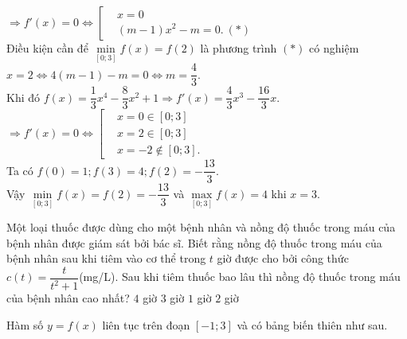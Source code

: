 \begin{ex}
\begin{ex}
{ $\Rightarrow f'(x)=0 \Leftrightarrow\left[\begin{aligned}&x=0 \\& (m-1) x^2-m=0.~(*)\end{aligned}\right. $ \\
 Điều kiện cần để $\min\limits_{[0; 3]} f(x)=f(2)$ là phương trình $(*)$ có nghiệm $x=2 \Leftrightarrow 4(m-1)-m=0 \Leftrightarrow m=\dfrac{4}{3}$. \\
 Khi đó $f(x)=\dfrac{1}{3} x^4-\dfrac{8}{3} x^2+1 \Rightarrow f'(x)=\dfrac{4}{3} x^3-\dfrac{16}{3} x$. \\
 $\Rightarrow f'(x)=0 \Leftrightarrow\left[\begin{aligned}&x=0 \in[0; 3] \\& x=2 \in[0; 3] \\& x=-2 \notin[0; 3].\end{aligned}\right. $ \\
 Ta có $f(0)=1; f(3)=4; f(2)=-\dfrac{13}{3}$. \\
 Vậy $\min\limits_{[0; 3]} f(x)=f(2)=-\dfrac{13}{3}$ và $\max\limits_{[0; 3]} f(x)=4$ khi $x=3$.
 }
\end{ex}
\begin{ex}%
 Một loại thuốc được dùng cho một bệnh nhân và nồng độ thuốc trong máu của bệnh nhân được giám sát bởi bác sĩ. Biết rằng nồng độ thuốc trong máu của bệnh nhân sau khi tiêm vào cơ thể trong $ t $ giờ được cho bởi công thức $ c(t)=\dfrac{t}{t^2+1}$(mg/L). Sau khi tiêm thuốc bao lâu thì nồng độ thuốc trong máu của bệnh nhân cao nhất?
 \choice
 {$4 $ giờ}
 {$3 $ giờ}
 {\True $ 1 $ giờ}
 {$2 $ giờ}
\end{ex}
\BTTF
\begin{ex}%
 Hàm số $y=f(x)$ liên tục trên đoạn $[-1;3]$ và có bảng biến thiên như sau.
 \begin{center}

\end{center}
\end{ex}
\end{ex}
